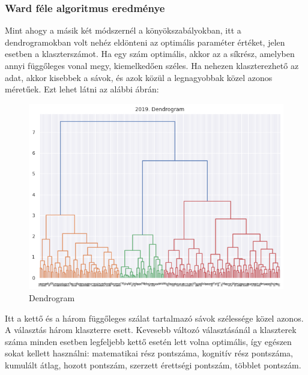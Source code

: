 \documentclass[12pt]{article}
\begin{document}
\subsubsection{Ward féle algoritmus eredménye}

Mint ahogy a másik két módszernél a könyökszabályokban, itt a dendrogramokban volt nehéz eldönteni az optimális paraméter értéket, jelen esetben a klaszterszámot. Ha egy szám optimális, akkor az a síkrész, amelyben annyi függőleges vonal megy, kiemelkedően széles. Ha nehezen klaszterezhető az adat, akkor kisebbek a sávok, és azok közül a legnagyobbak közel azonos méretűek. Ezt lehet látni az alábbi ábrán:

\begin{figure}[H]
\centering
\includegraphics[width = \textwidth]{kepek/dendrogram.png}
\caption{Dendrogram}
\label{fig:dendrogram}
\end{figure}

Itt a kettő és a három függőleges szálat tartalmazó sávok szélessége közel azonos. A választás három klaszterre esett. Kevesebb változó választásánál a klaszterek száma minden esetben legfeljebb kettő esetén lett volna optimális, így egészen sokat kellett használni: matematikai rész pontszáma, kognitív rész pontszáma, kumulált átlag, hozott pontszám, szerzett érettségi pontszám, többlet pontszám.
\end{document}
